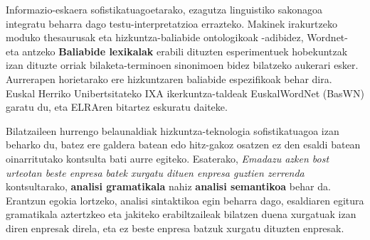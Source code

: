 \begin{multicols}{2}
Informazio-eskaera sofistikatuagoetarako, ezagutza linguistiko sakonagoa integratu beharra dago testu-interpretatzioa errazteko. Makinek irakurtzeko moduko thesaurusak eta hizkuntza-baliabide ontologikoak -adibidez, Wordnet- eta antzeko \textbf{Baliabide lexikalak} erabili dituzten esperimentuek hobekuntzak izan dituzte orriak bilaketa-terminoen sinonimoen bidez bilatzeko aukerari esker. Aurrerapen horietarako ere hizkuntzaren baliabide espezifikoak behar dira. Euskal Herriko Unibertsitateko IXA ikerkuntza-taldeak EuskalWordNet (BasWN) garatu du, eta ELRAren bitartez eskuratu daiteke.


Bilatzaileen hurrengo belaunaldiak hizkuntza-teknologia sofistikatuagoa izan beharko du, batez ere galdera batean edo hitz-gakoz osatzen ez den esaldi batean oinarritutako kontsulta bati aurre egiteko. Esaterako, \textit{Emadazu azken bost urteotan beste enpresa batek xurgatu dituen enpresa guztien zerrenda} kontsultarako, 
\textbf{analisi gramatikala}
nahiz \textbf{analisi semantikoa} behar da. Erantzun egokia lortzeko, analisi sintaktikoa egin beharra dago, esaldiaren egitura gramatikala aztertzkeo eta jakiteko erabiltzaileak bilatzen duena xurgatuak izan diren enpresak direla, eta ez beste enpresa batzuk xurgatu dituzten enpresak.


\end{multicols}
